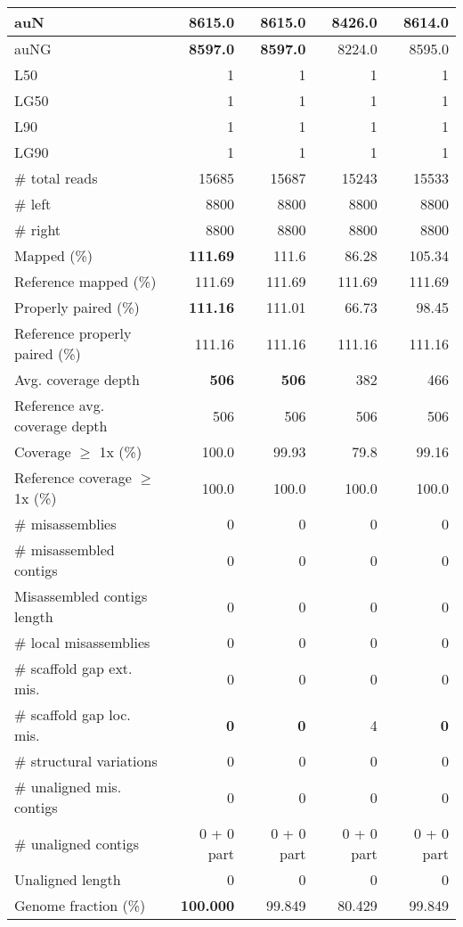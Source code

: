 \documentclass[12pt,a4paper]{article}
\begin{document}
\begin{table}[ht]
\begin{center}
\begin{tabular}{|l*{4}{|r}|}
auN & {\bf 8615.0} & {\bf 8615.0} & 8426.0 & 8614.0 \\ \hline
auNG & {\bf 8597.0} & {\bf 8597.0} & 8224.0 & 8595.0 \\ \hline
L50 & 1 & 1 & 1 & 1 \\ \hline
LG50 & 1 & 1 & 1 & 1 \\ \hline
L90 & 1 & 1 & 1 & 1 \\ \hline
LG90 & 1 & 1 & 1 & 1 \\ \hline
\# total reads & 15685 & 15687 & 15243 & 15533 \\ \hline
\# left & 8800 & 8800 & 8800 & 8800 \\ \hline
\# right & 8800 & 8800 & 8800 & 8800 \\ \hline
Mapped (\%) & {\bf 111.69} & 111.6 & 86.28 & 105.34 \\ \hline
Reference mapped (\%) & 111.69 & 111.69 & 111.69 & 111.69 \\ \hline
Properly paired (\%) & {\bf 111.16} & 111.01 & 66.73 & 98.45 \\ \hline
Reference properly paired (\%) & 111.16 & 111.16 & 111.16 & 111.16 \\ \hline
Avg. coverage depth & {\bf 506} & {\bf 506} & 382 & 466 \\ \hline
Reference avg. coverage depth & 506 & 506 & 506 & 506 \\ \hline
Coverage $\geq$ 1x (\%) & 100.0 & 99.93 & 79.8 & 99.16 \\ \hline
Reference coverage $\geq$ 1x (\%) & 100.0 & 100.0 & 100.0 & 100.0 \\ \hline
\# misassemblies & 0 & 0 & 0 & 0 \\ \hline
\# misassembled contigs & 0 & 0 & 0 & 0 \\ \hline
Misassembled contigs length & 0 & 0 & 0 & 0 \\ \hline
\# local misassemblies & 0 & 0 & 0 & 0 \\ \hline
\# scaffold gap ext. mis. & 0 & 0 & 0 & 0 \\ \hline
\# scaffold gap loc. mis. & {\bf 0} & {\bf 0} & 4 & {\bf 0} \\ \hline
\# structural variations & 0 & 0 & 0 & 0 \\ \hline
\# unaligned mis. contigs & 0 & 0 & 0 & 0 \\ \hline
\# unaligned contigs & 0 + 0 part & 0 + 0 part & 0 + 0 part & 0 + 0 part \\ \hline
Unaligned length & 0 & 0 & 0 & 0 \\ \hline
Genome fraction (\%) & {\bf 100.000} & 99.849 & 80.429 & 99.849 \\ \hline

\end{tabular}
\end{center}
\end{table}
\end{document}
